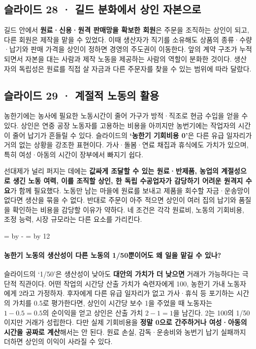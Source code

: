 \documentclass[10pt,a4paper]{article}
\newcommand{\ReserveQuestionSpace}{%
  \par\begingroup
  \dimen0=\pagegoal \advance\dimen0 by -\pagetotal
  \dimen2=\baselineskip \multiply\dimen2 by 12
  \ifdim\dimen0<\dimen2 \newpage\fi
  \endgroup}
\begin{document}
\subsection{슬라이드 28 · 길드 분화에서 상인 자본으로}
길드 안에서 \textbf{원료·신용·원격 판매망을 확보한 회원}은 주문을 조직하는 상인이 되고, 다른 회원은 제작을 맡을 수 있었다. 이때 생산자가 직기를 소유해도 상품의 종류·수량·납기와 판매 가격을 상인이 정하면 경영의 주도권이 이동한다. 앞의 계약 구조가 누적되면서 자본을 대는 사람과 제작 노동을 제공하는 사람의 역할이 분화한 것이다. 생산자의 독립성은 원료를 직접 살 자금과 다른 주문자를 찾을 수 있는 범위에 따라 달랐다.\par

\subsection{슬라이드 29 · 계절적 노동의 활용}
농한기에는 농사에 필요한 노동시간이 줄어 가구가 방적·직조로 현금 수입을 얻을 수 있다. 상인은 연중 공장 노동자를 고용하는 비용을 아끼지만 농번기에는 작업자의 시간이 줄어 납기가 흔들릴 수 있다. 슬라이드의 \textbf{‘농한기 기회비용 0’}은 다른 유급 일자리가 거의 없는 상황을 강조한 표현이다. 가사·돌봄·연료 채집과 휴식에도 가치가 있으며, 특히 여성·아동의 시간이 장부에서 빠지기 쉽다.\par

선대제가 널리 퍼지는 데에는 \textbf{값싸게 조달할 수 있는 원료·반제품, 농업의 계절성으로 생긴 노동 여력, 이를 조직할 상인, 한 독립 수공업자가 감당하기 어려운 원격지 수요}가 함께 필요했다. 노동만 남는 마을에 원료를 보내고 제품을 회수할 자금·운송망이 없다면 생산을 묶을 수 없다. 반대로 주문이 아주 적으면 상인이 여러 집의 납기와 품질을 확인하는 비용을 감당할 이유가 약하다. 네 조건은 각각 원료비, 노동의 기회비용, 조정 능력, 시장 규모라는 다른 요소를 가리킨다.\par

\ReserveQuestionSpace
\paragraph{농한기 노동의 생산성이 다른 노동의 1/50뿐이어도 왜 일을 맡길 수 있나?}
슬라이드의 ‘1/50’은 생산성이 낮아도 \textbf{대안의 가치가 더 낮으면} 거래가 가능하다는 극단적 직관이다. 어떤 작업의 시간당 산출 가치가 숙련자에게 100, 농한기 가내 노동자에게 2라고 가정하자. 후자에게 다른 유급 일자리가 없고 가사·휴식 등 포기하는 시간의 가치를 0.5로 평가한다면, 상인이 시간당 보수 1을 주었을 때 노동자는 $1-0.5=0.5$의 순이익을 얻고 상인은 산출 가치 $2-1=1$을 남긴다. 2는 100의 1/50이지만 거래가 성립한다. 다만 실제 기회비용을 \textbf{정말 0으로 간주하거나 여성·아동의 시간을 공짜로 계산}해서는 안 된다. 원료 손실, 감독·운송비와 농번기 납기 실패까지 더하면 상인의 이익이 사라질 수 있다.\par
\end{document}
